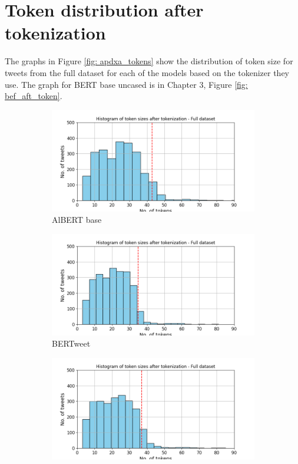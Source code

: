 \section{Token distribution after tokenization}
\label{sec: apdxa_token_dist}
The graphs in Figure \ref{fig: apdxa_tokens} show the distribution of token size for tweets from the full dataset for each of the models based on the tokenizer they use. The graph for BERT base uncased is in Chapter 3, Figure \ref{fig: bef_aft_token}.
\begin{figure}[htbp]
    \centering
    \captionsetup{font=small}
    \begin{subfigure}[b]{0.48\textwidth}
        \includegraphics[width=\textwidth]{figures/token_pp_hist_albert-base-v2.png}
        \caption{AlBERT base}
        \label{fig: token_pp_hist_albert}
    \end{subfigure}
    \hfill
    \begin{subfigure}[b]{0.48\textwidth}
        \includegraphics[width=\textwidth]{figures/token_pp_hist_vinai-bertweet-base.png}
        \caption{BERTweet}
        \label{fig: token_pp_hist_bertwteet}
    \end{subfigure}
    \begin{subfigure}[b]{0.48\textwidth}
        \includegraphics[width=\textwidth]{figures/token_pp_hist_prajjwal1-bert-tiny.png}

\end{subfigure}
\end{figure}
